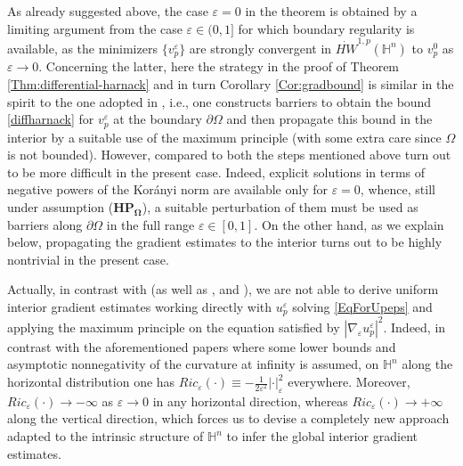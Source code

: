 \documentclass[10pt]{amsart}
\numberwithin{equation}{section}
\theoremstyle{definition}
\newcommand{\He}{\mathbb{H}}
\begin{document}
As already suggested above, the case $\varepsilon=0$ in the theorem is obtained by a limiting argument from the case $\varepsilon \in (0,1]$ for which boundary regularity is available, as the minimizers $\{ v^\varepsilon_p\}$ are strongly convergent in $\dot{HW}^{1,p}(\mathbb{H}^{n})$ to $v^0_p$ as $\varepsilon \to 0$.
Concerning the latter, here the strategy in the proof  of Theorem \ref{Thm:differential-harnack} and in turn Corollary \ref{Cor:gradbound} is similar in the spirit to the one adopted in \cite{Moser}, i.e., one constructs barriers to obtain the bound \eqref{diffharnack} for $v^\varepsilon_p$ at the boundary $\partial \Omega$ and then propagate this bound in the interior by a suitable use of the maximum principle (with some extra care since $\Omega$ is not bounded).
However, compared to \cite{Moser} both the steps mentioned above turn out to be more difficult in the present case. Indeed, explicit solutions in terms of negative powers of the Kor\'anyi norm are available only for $\varepsilon=0$, whence, still under assumption ($\mathbf{HP_\Omega}$), a suitable perturbation of them must be used as barriers along $\partial \Omega$ in the full range $\varepsilon \in [0,1]$. On the other hand, as we explain below, propagating the gradient estimates to the interior turns out to be highly nontrivial in the present case. 

Actually, in contrast with \cite{Moser} (as well as  \cite{KotschwarNi}, \cite{CuiZhao} and \cite{Rigoli}),  we are not able to derive uniform interior gradient estimates working directly with $u^\varepsilon_p$ solving \eqref{EqForUpeps} and applying the maximum principle on the equation satisfied by $|\nabla_\varepsilon u^\varepsilon_p|^2$. Indeed, in contrast with the aforementioned papers where some lower bounds and asymptotic nonnegativity of the curvature at infinity is assumed, on $\He^n$ along the horizontal distribution one has  $Ric_\varepsilon (\cdot)\equiv -\frac{1}{2 \varepsilon^2}|\cdot|_\varepsilon^2$ everywhere. Moreover,  $Ric_\varepsilon (\cdot) \to -\infty $ as $\varepsilon \to 0$ in any horizontal direction, whereas $Ric_\varepsilon (\cdot) \to +\infty$ along the vertical direction, which forces us to devise a completely new approach adapted to the intrinsic structure of $\He^n$ to infer the global interior gradient estimates.
 
\end{document}

